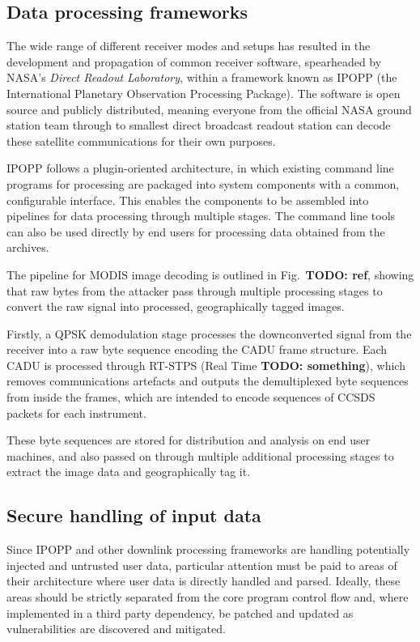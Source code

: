 \subsection{Data processing frameworks}

The wide range of different receiver modes and setups has resulted in the development and propagation of common receiver software, spearheaded by NASA's \textit{Direct Readout Laboratory}, within a framework known as IPOPP (the International Planetary Observation Processing Package).
The software is open source and publicly distributed, meaning everyone from the official NASA ground station team through to smallest direct broadcast readout station can decode these satellite communications for their own purposes.

IPOPP follows a plugin-oriented architecture, in which existing command line programs for processing are packaged into system components with a common, configurable interface.
This enables the components to be assembled into pipelines for data processing through multiple stages.
The command line tools can also be used directly by end users for processing data obtained from the archives.

The pipeline for MODIS image decoding is outlined in Fig.~\textbf{TODO: ref}, showing that raw bytes from the attacker pass through multiple processing stages to convert the raw signal into processed, geographically tagged images.

Firstly, a QPSK demodulation stage processes the downconverted signal from the receiver into a raw byte sequence encoding the CADU frame structure.
Each CADU is processed through RT-STPS (Real Time \textbf{TODO: something}), which removes communications artefacts and outputs the demultiplexed byte sequences from inside the frames, which are intended to encode sequences of CCSDS packets for each instrument.

These byte sequences are stored for distribution and analysis on end user machines, and also passed on through multiple additional processing stages to extract the image data and geographically tag it.

\subsection{Secure handling of input data}

Since IPOPP and other downlink processing frameworks are handling potentially injected and untrusted user data, particular attention must be paid to areas of their architecture where user data is directly handled and parsed.
Ideally, these areas should be strictly separated from the core program control flow and, where implemented in a third party dependency, be patched and updated as vulnerabilities are discovered and mitigated.

